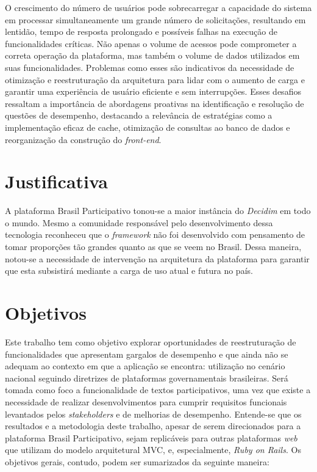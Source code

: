 O crescimento do número de usuários pode sobrecarregar a capacidade do sistema em processar simultaneamente um grande número de solicitações, resultando em lentidão, tempo de resposta prolongado e possíveis falhas na execução de funcionalidades críticas. Não apenas o volume de acessos pode comprometer a correta operação da plataforma, mas também o volume de dados utilizados em suas funcionalidades. Problemas como esses são indicativos da necessidade de otimização e reestruturação da arquitetura para lidar com o aumento de carga e garantir uma experiência de usuário eficiente e sem interrupções. Esses desafios ressaltam a importância de abordagens proativas na identificação e resolução de questões de desempenho, destacando a relevância de estratégias como a implementação eficaz de cache, otimização de consultas ao banco de dados e reorganização da construção do \textit{front-end}.

\section{Justificativa}

A plataforma Brasil Participativo tonou-se a maior instância do \textit{Decidim} em todo o mundo. Mesmo a comunidade responsável pelo desenvolvimento dessa tecnologia reconheceu que o \textit{framework} não foi desenvolvido com pensamento de tomar proporções tão grandes quanto as que se veem no Brasil. Dessa maneira, notou-se a necessidade de intervenção na arquitetura da plataforma para garantir que esta subsistirá mediante a carga de uso atual e futura no país.

\section{Objetivos}

Este trabalho tem como objetivo explorar oportunidades de reestruturação de funcionalidades que apresentam gargalos de desempenho e que ainda não se adequam ao contexto em que a aplicação se encontra: utilização no cenário nacional seguindo diretrizes de plataformas governamentais brasileiras.
Será tomada como foco a funcionalidade de textos participativos, uma vez que existe a necessidade de realizar desenvolvimentos para cumprir requisitos funcionais levantados pelos \textit{stakeholders} e de melhorias de desempenho.
Entende-se que os resultados e a metodologia deste trabalho, apesar de serem direcionados para a plataforma Brasil Participativo, sejam replicáveis para outras plataformas \textit{web} que utilizam do modelo arquitetural MVC, e, especialmente, \textit{Ruby on Rails}.
Os objetivos gerais, contudo, podem ser sumarizados da seguinte maneira:

